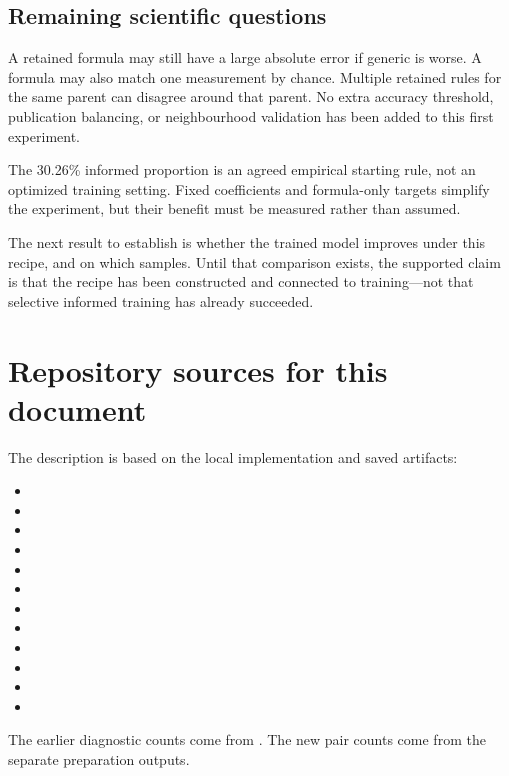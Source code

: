 \documentclass[11pt]{article}
\begin{document}
\subsection{Remaining scientific questions}
A retained formula may still have a large absolute error if generic is worse.
A formula may also match one measurement by chance. Multiple retained rules for
the same parent can disagree around that parent. No extra accuracy threshold,
publication balancing, or neighbourhood validation has been added to this first
experiment.

The 30.26\% informed proportion is an agreed empirical starting rule, not an
optimized training setting. Fixed coefficients and formula-only targets simplify
the experiment, but their benefit must be measured rather than assumed.

The next result to establish is whether the trained model improves under this
recipe, and on which samples. Until that comparison exists, the supported claim
is that the recipe has been constructed and connected to training---not that
selective informed training has already succeeded.

\section{Repository sources for this document}
The description is based on the local implementation and saved artifacts:
\begin{itemize}
\item {}
\item {}
\item {}
\item {}
\item {}
\item {}
\item {}
\item {}
\item {}
\item {}
\item {}
\item {}
\end{itemize}
The earlier diagnostic counts come from
.
The new pair counts come from the separate
 preparation outputs.
\end{document}
